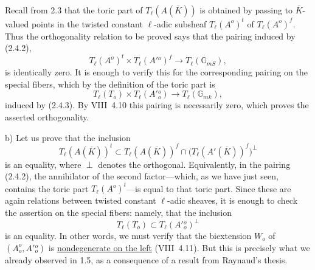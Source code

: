 Recall from 2.3 that the toric part of
$T_\ell(A(\overline K))$ is obtained by passing to
$\overline K$-valued points in the twisted constant $\ell$-adic
subsheaf $T_\ell(A^o)^t$ of $T_\ell(A^o)^f$.  Thus the orthogonality
relation to be proved says that the pairing induced by (2.4.2),
\begin{equation}\tag{2.4.4}
 T_\ell(A^o)^t\times T_\ell(A'{}^o)^f
 \longrightarrow T_\ell(\mathbb G_{mS}),
\end{equation}
is identically zero.  It is enough to verify this for the corresponding
pairing on the special fibers, which by the definition of the toric
part is
\begin{equation}\tag{2.4.5}
 T_\ell(T_o)\times T_\ell(A'{}_o^o)
 \longrightarrow T_\ell(\mathbb G_{mk}),
\end{equation}
induced by (2.4.3).  By VIII~4.10 this pairing is necessarily zero,
which proves the asserted orthogonality.

\smallskip
\noindent
b) Let us prove that the inclusion
\begin{equation}\tag{2.4.6}
 T_\ell(A(\overline K))^t\subset
 T_\ell(A(\overline K))^f\cap
 \bigl(T_\ell(A'(\overline K))^f\bigr)^\perp
\end{equation}
is an equality, where $\perp$ denotes the orthogonal.  Equivalently, in
the pairing (2.4.2), the annihilator of the second factor---which, as
we have just seen, contains the toric part $T_\ell(A^o)^t$---is equal
to that toric part.  Since these are again relations between twisted
constant $\ell$-adic sheaves, it is enough to check the assertion on
the special fibers: namely, that the inclusion
\begin{equation}\tag{2.4.7}
 T_\ell(T_o)\subset T_\ell(A'{}_o^o)^\perp
\end{equation}
is an equality.  In other words, we must verify that the biextension
$W_o$ of $(A_o^o,A'{}_o^o)$ is \underline{nondegenerate on the left}
(VIII~4.11).  But this is precisely what we already observed in 1.5,
as a consequence of a result from Raynaud's thesis.
